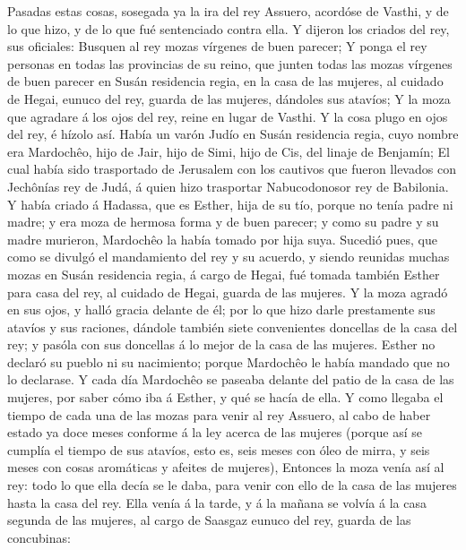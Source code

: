  Pasadas estas cosas, sosegada ya la ira del rey Assuero,
acordóse de Vasthi, y de lo que hizo, y de lo que fué sentenciado contra
ella.  Y dijeron los criados del rey, sus oficiales: Busquen
al rey mozas vírgenes de buen parecer;  Y ponga el rey
personas en todas las provincias de su reino, que junten todas las mozas
vírgenes de buen parecer en Susán residencia regia, en la casa de las
mujeres, al cuidado de Hegai, eunuco del rey, guarda de las mujeres,
dándoles sus atavíos;  Y la moza que agradare á los ojos del
rey, reine en lugar de Vasthi. Y la cosa plugo en ojos del rey, é hízolo
así.  Había un varón Judío en Susán residencia regia, cuyo
nombre era Mardochêo, hijo de Jair, hijo de Simi, hijo de Cis, del
linaje de Benjamín;  El cual había sido trasportado de
Jerusalem con los cautivos que fueron llevados con Jechônías rey de
Judá, á quien hizo trasportar Nabucodonosor rey de Babilonia.
 Y había criado á Hadassa, que es Esther, hija de su tío,
porque no tenía padre ni madre; y era moza de hermosa forma y de buen
parecer; y como su padre y su madre murieron, Mardochêo la había tomado
por hija suya.  Sucedió pues, que como se divulgó el
mandamiento del rey y su acuerdo, y siendo reunidas muchas mozas en
Susán residencia regia, á cargo de Hegai, fué tomada también Esther para
casa del rey, al cuidado de Hegai, guarda de las mujeres.  Y
la moza agradó en sus ojos, y halló gracia delante de él; por lo que
hizo darle prestamente sus atavíos y sus raciones, dándole también siete
convenientes doncellas de la casa del rey; y pasóla con sus doncellas á
lo mejor de la casa de las mujeres.  Esther no declaró su
pueblo ni su nacimiento; porque Mardochêo le había mandado que no lo
declarase.  Y cada día Mardochêo se paseaba delante del
patio de la casa de las mujeres, por saber cómo iba á Esther, y qué se
hacía de ella.  Y como llegaba el tiempo de cada una de las
mozas para venir al rey Assuero, al cabo de haber estado ya doce meses
conforme á la ley acerca de las mujeres (porque así se cumplía el tiempo
de sus atavíos, esto es, seis meses con óleo de mirra, y seis meses con
cosas aromáticas y afeites de mujeres),  Entonces la moza
venía así al rey: todo lo que ella decía se le daba, para venir con ello
de la casa de las mujeres hasta la casa del rey.  Ella
venía á la tarde, y á la mañana se volvía á la casa segunda de las
mujeres, al cargo de Saasgaz eunuco del rey, guarda de las concubinas:
